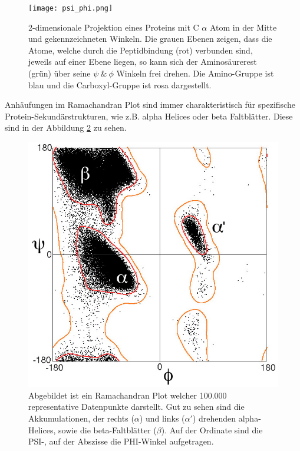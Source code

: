 \begin{figure}
    \centering
    \texttt{[image: psi\_phi.png]}
    \caption{2-dimensionale Projektion eines Proteins mit C $\alpha$ Atom in der Mitte und gekennzeichneten Winkeln. Die grauen Ebenen zeigen, dass die Atome, welche durch die Peptidbindung (rot) verbunden sind, jeweils auf einer Ebene liegen, so kann sich der Aminosäurerest (grün) über seine $\psi\ \&\ \phi$ Winkeln frei drehen. Die Amino-Gruppe ist blau und die Carboxyl-Gruppe ist rosa dargestellt.\protect\footnotemark}
    \label{fig:psi_phi}
\end{figure}

Anhäufungen im Ramachandran Plot sind immer charakteristisch für spezifische Protein-Sekundärstrukturen, wie z.B. alpha Helices oder beta Faltblätter. Diese sind in der Abbildung \ref{fig:ramaplot} zu sehen.

\begin{figure}[H]
    \centering
    \includegraphics[width=.80\textwidth]{images/Ramaplot.png}
    \caption{Abgebildet ist ein Ramachandran Plot welcher 100.000 representative Datenpunkte darstellt. Gut zu sehen sind die Akkumulationen, der rechts ($\alpha$) und links ($\alpha'$) drehenden alpha-Helices, sowie die beta-Faltblätter ($\beta$). Auf der Ordinate sind die PSI-, auf der Abszisse die PHI-Winkel aufgetragen\protect\footnotemark.}
    \label{fig:ramaplot}
\end{figure}

